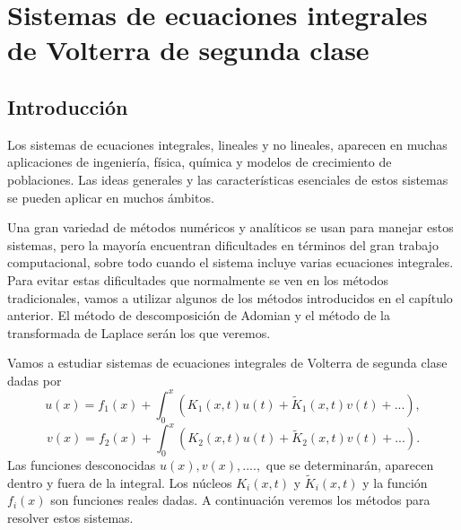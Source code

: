 \chapter{Sistemas de ecuaciones integrales de Volterra de segunda clase}
\section{Introducción}
Los sistemas de ecuaciones integrales, lineales y no lineales, aparecen en muchas aplicaciones de ingeniería, física, química y modelos de crecimiento de poblaciones. Las ideas generales y las características esenciales de estos sistemas se pueden aplicar en muchos ámbitos.

Una gran variedad de métodos numéricos y analíticos se usan para manejar estos sistemas, pero la mayoría encuentran dificultades en términos del gran trabajo computacional, sobre todo cuando el sistema incluye varias ecuaciones integrales. Para evitar estas dificultades que normalmente se ven en los métodos tradicionales, vamos a utilizar algunos de los métodos introducidos en el capítulo anterior. El método de descomposición de Adomian y el método de la transformada de Laplace serán los que veremos.

Vamos a estudiar sistemas de ecuaciones integrales de Volterra de segunda clase dadas por
\begin{equation}
	u(x) = f_1(x) + \int_{0}^{x}(K_1(x,t)u(t) + \tilde{K}_1(x,t)v(t)+...),
\end{equation}
\begin{equation}
	v(x) = f_2(x) + \int_{0}^{x}(K_2(x,t)u(t) + \tilde{K}_2(x,t)v(t)+...).
\end{equation}
Las funciones desconocidas $u(x), v(x), .... ,$ que se determinarán, aparecen dentro y fuera de la integral. Los núcleos $K_i(x,t)$ y $\tilde{K}_i(x,t)$ y la función $f_i(x)$ son funciones reales dadas. A continuación veremos los métodos para resolver estos sistemas.
